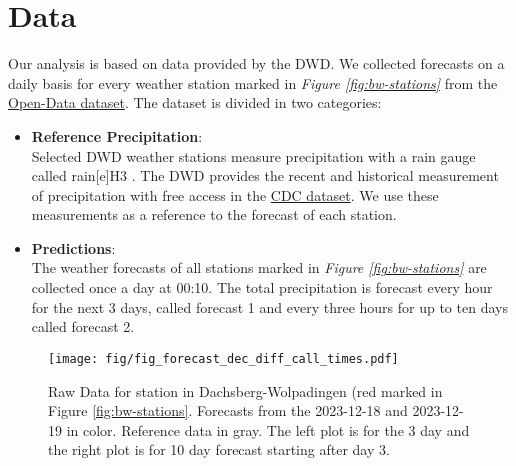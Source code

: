 \documentclass{article}
\theoremstyle{plain}
\theoremstyle{definition}
\theoremstyle{remark}
\begin{document}
\section{Data}\label{sec:Data}
Our analysis is based on data provided by the DWD. We collected forecasts on a
daily basis for every weather station marked in \textit{Figure
    \ref{fig:bw-stations}} from the
\href{https://opendata.dwd.de/climate_environment/CDC/}{Open-Data dataset}. The
dataset is divided in two categories:
\begin{itemize}
    \item \textbf{Reference Precipitation}:\\
          Selected DWD weather stations measure precipitation with a rain gauge
          called rain[e]H3 \cite{rain-e}. The DWD provides the recent and historical
          measurement of precipitation with free access in the
          \href{https://opendata.dwd.de/climate_environment/CDC/observations_germany/climate/hourly/precipitation/}{CDC
              dataset}. We use these measurements as a reference to the forecast of each
          station.

    \item \textbf{Predictions}:\\
          The weather forecasts of all stations marked in \textit{Figure
              \ref{fig:bw-stations}} are collected once a day at 00:10. The total
          precipitation is forecast every hour for the next 3 days, called forecast 1 and
          every three hours for up to ten days called forecast 2.
\end{itemize}

\begin{figure}[h]
    \centering
    \label{fig:dec_diff_call_times}
    \texttt{[image: fig/fig\_forecast\_dec\_diff\_call\_times.pdf]}
    \caption{Raw Data for station in Dachsberg-Wolpadingen (red marked in
        Figure \ref{fig:bw-stations}. Forecasts from the 2023-12-18 and 2023-12-19 in
        color. Reference data in gray. The left plot is for the 3 day and the right
        plot is for 10 day forecast starting after day 3. }

\end{figure}
\end{document}
